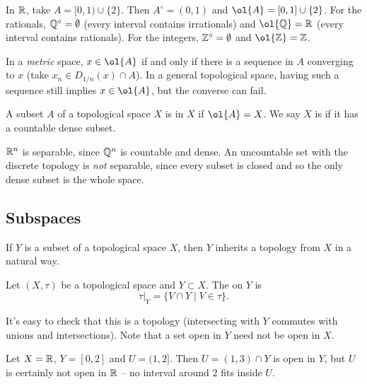 \documentclass[a4paper]{scrartcl}
\begin{document}
\begin{example}
    In $\mathbb{R}$, take $A = [0, 1) \cup \{2\}$. Then $A^{\circ} = (0, 1)$ and $\ol{A} = [0, 1] \cup \{2\}$. For the rationals, $\mathbb{Q}^{\circ} = \emptyset$ (every interval contains irrationals) and $\ol{\Q} = \R$ (every interval contains rationals). For the integers, $\mathbb{Z}^{\circ} = \emptyset$ and $\ol{\Z} = \Z$.
\end{example}

\begin{remark}
    In a \emph{metric} space, $x \in \ol{A}$ if and only if there is a sequence in $A$ converging to $x$ (take $x_n \in D_{1/n}(x) \cap A$). In a general topological space, having such a sequence still implies $x \in \ol{A}$, but the converse can fail.
\end{remark}

\begin{definition}
    A subset $A$ of a topological space $X$ is  in $X$ if $\ol{A} = X$. We say $X$ is  if it has a countable dense subset.
\end{definition}

\begin{example}
    $\mathbb{R}^n$ is separable, since $\mathbb{Q}^n$ is countable and dense. An uncountable set with the discrete topology is \emph{not} separable, since every subset is closed and so the only dense subset is the whole space.
\end{example}

\subsection{Subspaces}

If $Y$ is a subset of a topological space $X$, then $Y$ inherits a topology from $X$ in a natural way.

\begin{definition}
    Let $(X, \tau)$ be a topological space and $Y \subset X$. The  on $Y$ is
    $$
    \tau|_Y = \{V \cap Y \mid V \in \tau\}.
    $$
\end{definition}

It's easy to check that this is a topology (intersecting with $Y$ commutes with unions and intersections). Note that a set open in $Y$ need not be open in $X$.

\begin{example}
    Let $X = \mathbb{R}$, $Y = [0, 2]$ and $U = (1, 2]$. Then $U = (1, 3) \cap Y$ is open in $Y$, but $U$ is certainly not open in $\mathbb{R}$ -- no interval around $2$ fits inside $U$.
\end{example}
\end{document}
